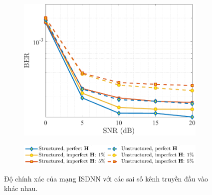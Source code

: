 \begin{figure}[ht]
    \centering
    \begin{subfigure}{\linewidth}
        \includegraphics[width=\linewidth]{figures/performance_2.pdf}
    \end{subfigure}
    \hfill
    \begin{subfigure}{\linewidth}
        \centering
        \includegraphics[width=.8\linewidth]{figures/lg_performance_21.pdf}
    \end{subfigure}
    \caption{Độ chính xác của mạng ISDNN với các sai số kênh truyền đầu vào khác nhau.}
    \label{fig:isdnn_1}
\end{figure}

